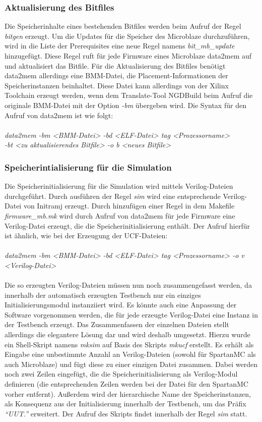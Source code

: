 \subsubsection{Aktualisierung des Bitfiles}
Die Speicherinhalte eines bestehenden Bitfiles werden beim Aufruf der Regel \textit{bitgen} erzeugt. Um die Updates für die Speicher des Microblaze durchzuführen, wird in die Liste der Prerequisites eine neue Regel namens \textit{bit\_mb\_update} hinzugefügt. Diese Regel ruft für jede Firmware eines Microblaze data2mem auf und aktualisiert das Bitfile. Für die Aktualisierung des Bitfiles benötigt data2mem allerdings eine BMM-Datei, die Placement-Informationen der Speicherinstanzen beinhaltet. Diese Datei kann allerdings von der Xilinx Toolchain erzeugt werden, wenn dem Translate-Tool NGDBuild beim Aufruf die originale BMM-Datei mit der Option \textit{-bm} übergeben wird. Die Syntax für den Aufruf von data2mem ist wie folgt:\\\\
\indent
\textit{data2mem -bm <BMM-Datei> -bd <ELF-Datei> tag <Prozessorname>\\
\indent \indent \indent -bt <zu aktualisierendes Bitfile> -o b <neues Bitfile>}
\subsubsection{Speicherintialisierung für die Simulation}
Die Speicherinitialisierung für die Simulation wird mittels Verilog-Dateien durchgeführt. Durch ausführen der Regel \textit{sim} wird eine entsprechende Verilog-Datei von Initramj erzeugt. Durch hinzufügen einer Regel in dem Makefile \textit{firmware\_mb.mk} wird durch Aufruf von data2mem für jede Firmware eine Verilog-Datei erzeugt, die die Speicherinitialisierung enthält. Der Aufruf hierfür ist ähnlich, wie bei der Erzeugung der UCF-Dateien:\\\\
\indent
\textit{data2mem -bm <BMM-Datei> -bd <ELF-Datei> tag <Prozessorname> -o v <Verilog-Datei>}\\\\
Die so erzeugten Verilog-Dateien müssen nun noch zusammengefasst werden, da innerhalb der automatisch erzeugten Testbench nur ein einziges Initialisierungsmodul instanziiert wird. Es könnte auch eine Anpassung der Software vorgenommen werden, die für jede erzeugte Verilog-Datei eine Instanz in der Testbench erzeugt. Das Zusammenfassen der einzelnen Dateien stellt allerdings die elegantere Lösung dar und wird deshalb umgesetzt. Hierzu wurde ein Shell-Skript namens \textit{mksim} auf Basis des Skripts \textit{mkucf} erstellt. Es erhält als Eingabe eine unbestimmte Anzahl an Verilog-Dateien (sowohl für SpartanMC als auch Microblaze) und fügt diese zu einer einzigen Datei zusammen. Dabei werden noch zwei Zeilen eingefügt, die die Speicherinitialisierung als Verilog-Modul definieren (die entsprechenden Zeilen werden bei der Datei für den SpartanMC vorher entfernt). Außerdem wird der hierarchische Name der Speicherinstanzen, als Konsequenz aus der Initialisierung innerhalb der Testbench, um das Präfix \textit{``UUT.''} erweitert. Der Aufruf des Skripts findet innerhalb der Regel \textit{sim} statt.

